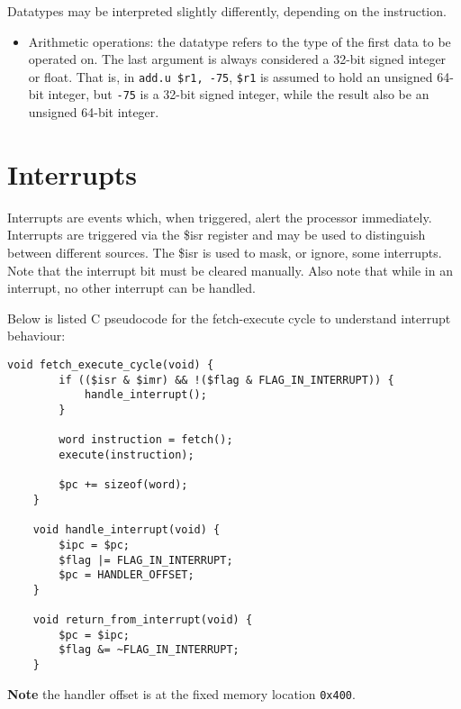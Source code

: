 \documentclass[10pt]{article}
\begin{document}
    \bigskip
    Datatypes may be interpreted slightly differently, depending on the instruction.

    \begin{itemize}
        \item Arithmetic operations: the datatype refers to the type of the first data to be operated on.
        The last argument is always considered a 32-bit signed integer or float.
        That is, in \texttt{add.u \$r1, -75}, \texttt{\$r1} is assumed to hold an unsigned 64-bit integer, but \texttt{-75} is a 32-bit signed integer, while the result also be an unsigned 64-bit integer.

    \end{itemize}

    \section{Interrupts}\label{sec:interrupts}

    Interrupts are events which, when triggered, alert the processor immediately.
    Interrupts are triggered via the \$isr register and may be used to distinguish between different sources.
    The \$isr is used to mask, or ignore, some interrupts.
    Note that the interrupt bit must be cleared manually.
    Also note that while in an interrupt, no other interrupt can be handled.

    Below is listed C pseudocode for the fetch-execute cycle to understand interrupt behaviour:

    \begin{lstlisting}[style=c,label={lst:lstlisting}]
    void fetch_execute_cycle(void) {
        if (($isr & $imr) && !($flag & FLAG_IN_INTERRUPT)) {
            handle_interrupt();
        }

        word instruction = fetch();
        execute(instruction);

        $pc += sizeof(word);
    }

    void handle_interrupt(void) {
        $ipc = $pc;
        $flag |= FLAG_IN_INTERRUPT;
        $pc = HANDLER_OFFSET;
    }

    void return_from_interrupt(void) {
        $pc = $ipc;
        $flag &= ~FLAG_IN_INTERRUPT;
    }
    \end{lstlisting}

    \textbf{Note} the handler offset is at the fixed memory location \texttt{0x400}.
\end{document}
